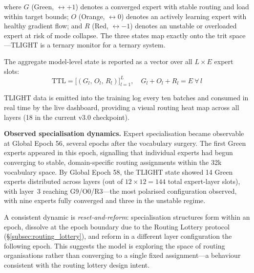 \documentclass[11pt,a4paper]{article}
\begin{document}
where $G$ (Green, $\leftrightarrow +1$) denotes a converged expert with stable
routing and load within target bounds; $O$ (Orange, $\leftrightarrow 0$) denotes an
actively learning expert with healthy gradient flow; and $R$ (Red, $\leftrightarrow -1$)
denotes an unstable or overloaded expert at risk of mode collapse. The three states
map exactly onto the trit space---TLIGHT is a ternary monitor for a ternary system.

The aggregate model-level state is reported as a vector over all $L \times E$
expert slots:
\begin{equation}
  \text{TTL} = \bigl[(G_l,\, O_l,\, R_l)\bigr]_{l=1}^{L},
  \quad G_l + O_l + R_l = E\ \forall\, l
\end{equation}

TLIGHT data is emitted into the training log every ten batches and consumed in
real time by the live dashboard, providing a visual routing heat map across all layers
(18 in the current v3.0 checkpoint).

\textbf{Observed specialisation dynamics.} Expert specialisation became observable
at Global Epoch 56, several epochs after the vocabulary surgery. The first Green
experts appeared in this epoch, signalling that individual experts had begun converging
to stable, domain-specific routing assignments within the 32k vocabulary space. By
Global Epoch 58, the TLIGHT state showed 14 Green experts distributed across layers
(out of $12 \times 12 = 144$ total expert-layer slots), with layer~3 reaching
G9/O0/R3---the most polarised configuration observed, with nine experts fully
converged and three in the unstable regime.

A consistent dynamic is \emph{reset-and-reform}: specialisation structures form
within an epoch, dissolve at the epoch boundary due to the Routing Lottery protocol
(\S\ref{subsec:routing_lottery}), and reform in a different layer configuration
the following epoch. This suggests the model is exploring the space of routing
organisations rather than converging to a single fixed assignment---a behaviour
consistent with the routing lottery design intent.
\end{document}
